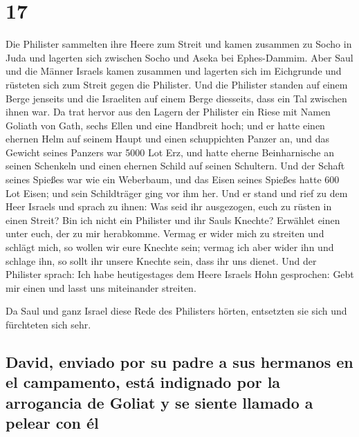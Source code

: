 \hypertarget{section-16}{%
\section{17}\label{section-16}}

 Die Philister sammelten ihre Heere zum Streit und kamen
zusammen zu Socho in Juda und lagerten sich zwischen Socho und Aseka bei
Ephes-Dammim.  Aber Saul und die Männer Israels kamen
zusammen und lagerten sich im Eichgrunde und rüsteten sich zum Streit
gegen die Philister.  Und die Philister standen auf einem
Berge jenseits und die Israeliten auf einem Berge diesseits, dass ein
Tal zwischen ihnen war.  Da trat hervor aus den Lagern der
Philister ein Riese mit Namen Goliath von Gath, sechs Ellen und eine
Handbreit hoch;  und er hatte einen ehernen Helm auf
seinem Haupt und einen schuppichten Panzer an, und das Gewicht seines
Panzers war 5000 Lot Erz,  und hatte eherne Beinharnische
an seinen Schenkeln und einen ehernen Schild auf seinen Schultern.
 Und der Schaft seines Spießes war wie ein Weberbaum, und
das Eisen seines Spießes hatte 600 Lot Eisen; und sein Schildträger ging
vor ihm her.  Und er stand und rief zu dem Heer Israels
und sprach zu ihnen: Was seid ihr ausgezogen, euch zu rüsten in einen
Streit? Bin ich nicht ein Philister und ihr Sauls Knechte? Erwählet
einen unter euch, der zu mir herabkomme.  Vermag er wider
mich zu streiten und schlägt mich, so wollen wir eure Knechte sein;
vermag ich aber wider ihn und schlage ihn, so sollt ihr unsere Knechte
sein, dass ihr uns dienet.  Und der Philister sprach: Ich
habe heutigestages dem Heere Israels Hohn gesprochen: Gebt mir einen und
lasst uns miteinander streiten.

 Da Saul und ganz Israel diese Rede des Philisters
hörten, entsetzten sie sich und fürchteten sich sehr.

\hypertarget{david-enviado-por-su-padre-a-sus-hermanos-en-el-campamento-estuxe1-indignado-por-la-arrogancia-de-goliat-y-se-siente-llamado-a-pelear-con-uxe9l}{%
\subsection{David, enviado por su padre a sus hermanos en el campamento,
está indignado por la arrogancia de Goliat y se siente llamado a pelear
con
él}\label{david-enviado-por-su-padre-a-sus-hermanos-en-el-campamento-estuxe1-indignado-por-la-arrogancia-de-goliat-y-se-siente-llamado-a-pelear-con-uxe9l}}

